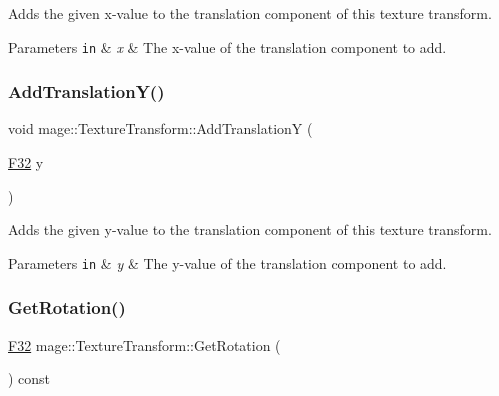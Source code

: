 Adds the given x-\/value to the translation component of this texture transform.


\begin{DoxyParams}[1]{Parameters}
\mbox{\tt in}  & {\em x} & The x-\/value of the translation component to add. \\
\hline
\end{DoxyParams}
\hypertarget{classmage_1_1_texture_transform_a4c9463ef0b5f3730560093d03b31de15}{}\label{classmage_1_1_texture_transform_a4c9463ef0b5f3730560093d03b31de15} 
\subsubsection{\texorpdfstring{Add\+Translation\+Y()}{AddTranslationY()}}
{\footnotesize\ttfamily void mage\+::\+Texture\+Transform\+::\+Add\+TranslationY (\begin{DoxyParamCaption}\item[{\hyperlink{namespacemage_aa97e833b45f06d60a0a9c4fc22ae02c0}{F32}}]{y }\end{DoxyParamCaption})\hspace{0.3cm}{\ttfamily [noexcept]}}

Adds the given y-\/value to the translation component of this texture transform.


\begin{DoxyParams}[1]{Parameters}
\mbox{\tt in}  & {\em y} & The y-\/value of the translation component to add. \\
\hline
\end{DoxyParams}
\hypertarget{classmage_1_1_texture_transform_ade561a56fa2e80b70c74620277a9afa1}{}\label{classmage_1_1_texture_transform_ade561a56fa2e80b70c74620277a9afa1} 
\subsubsection{\texorpdfstring{Get\+Rotation()}{GetRotation()}}
{\footnotesize\ttfamily \hyperlink{namespacemage_aa97e833b45f06d60a0a9c4fc22ae02c0}{F32} mage\+::\+Texture\+Transform\+::\+Get\+Rotation (\begin{DoxyParamCaption}{ }\end{DoxyParamCaption}) const\hspace{0.3cm}{\ttfamily [noexcept]}}

